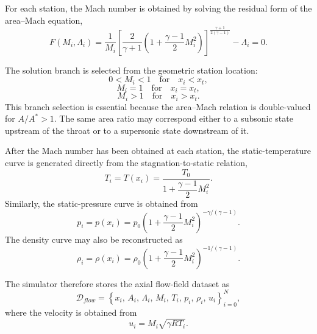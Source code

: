 For each station, the Mach number is obtained by solving the residual form of the area--Mach equation,
\begin{equation}
F(M_i,\Lambda_i)=
\frac{1}{M_i}
\left[
\frac{2}{\gamma+1}
\left(1+\frac{\gamma-1}{2}M_i^2\right)
\right]^{\frac{\gamma+1}{2(\gamma-1)}}
-\Lambda_i=0.
\label{eq:mach_curve_residual}
\end{equation}

The solution branch is selected from the geometric station location:
\begin{equation}
0<M_i<1 \quad \text{for} \quad x_i<x_t,
\end{equation}
\begin{equation}
M_i=1 \quad \text{for} \quad x_i=x_t,
\end{equation}
\begin{equation}
M_i>1 \quad \text{for} \quad x_i>x_t.
\end{equation}
This branch selection is essential because the area--Mach relation is double-valued for \(A/A^*>1\). The same area ratio may correspond either to a subsonic state upstream of the throat or to a supersonic state downstream of it.

After the Mach number has been obtained at each station, the static-temperature curve is generated directly from the stagnation-to-static relation,
\begin{equation}
T_i=T(x_i)=\frac{T_0}{1+\dfrac{\gamma-1}{2}M_i^2}.
\label{eq:temperature_curve}
\end{equation}
Similarly, the static-pressure curve is obtained from
\begin{equation}
p_i=p(x_i)=p_0
\left(1+\frac{\gamma-1}{2}M_i^2\right)^{-\gamma/(\gamma-1)}.
\label{eq:pressure_curve}
\end{equation}
The density curve may also be reconstructed as
\begin{equation}
\rho_i=\rho(x_i)=\rho_0
\left(1+\frac{\gamma-1}{2}M_i^2\right)^{-1/(\gamma-1)}.
\label{eq:density_curve}
\end{equation}

The simulator therefore stores the axial flow-field dataset as
\begin{equation}
\mathcal{D}_{flow}=\left\{x_i,\,A_i,\,\Lambda_i,\,M_i,\,T_i,\,p_i,\,\rho_i,\,u_i\right\}_{i=0}^{N},
\label{eq:flow_dataset}
\end{equation}
where the velocity is obtained from
\begin{equation}
u_i=M_i\sqrt{\gamma R T_i}.
\label{eq:velocity_curve}
\end{equation}

